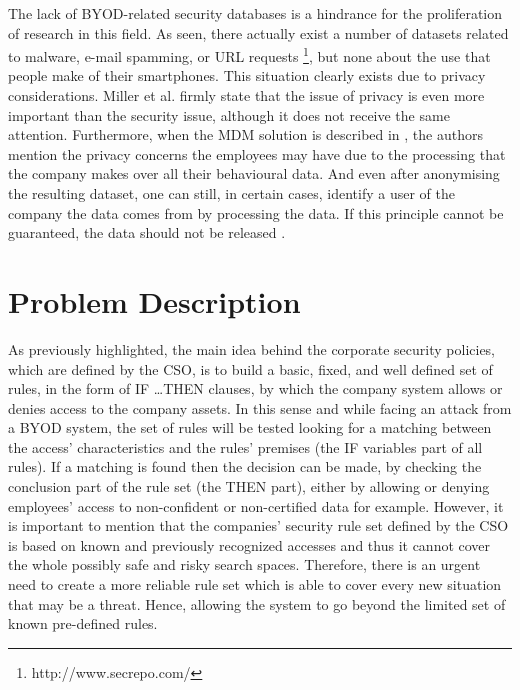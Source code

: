 \documentclass[a4paper,10pt,twocolumn,preprint,3p]{elsarticle}
\begin{document}
The lack of BYOD-related security databases is a hindrance for the proliferation of research in this field. As seen, there actually exist a number of datasets related to malware, e-mail spamming, or URL requests \footnote{http://www.secrepo.com/}, but none about the use that people make of their smartphones. This situation clearly exists due to privacy considerations. Miller et al. \cite{Miller201253} firmly state that the issue of privacy is even more important than the security issue, although it does not receive the same attention. Furthermore, when the MDM solution is described in \cite{ali2015analysis}, the authors mention the privacy concerns the employees may have due to the processing that the company makes over all their behavioural data. And even after anonymising the resulting dataset, one can still, in certain cases, identify a user of the company the data comes from by processing the data. If this principle cannot be guaranteed, the data should not be released \cite{boillat2014handbook}.


\section{Problem Description}
\label{sec:problem}

As previously highlighted, the main idea behind the corporate security policies, which are defined by the CSO, is to build a basic, fixed, and well defined set of rules, in the form of \textsc{IF \ldots THEN} clauses,  by which the company system allows or denies access to the company assets. In this sense and while facing an attack from a BYOD system, the set of rules will be tested looking for a matching between the access' characteristics and the rules' premises (the IF variables part of all rules). If a matching is found then the decision can be made, by checking the conclusion part of the rule set (the THEN part), either by allowing or denying employees' access to non-confident or non-certified data for example. However, it is important to mention that the companies' security rule set defined by the CSO is based on known and previously recognized accesses and thus it cannot cover the whole possibly safe and risky search spaces. Therefore, there is an urgent need to create a more reliable rule set which is able to cover every new situation that may be a threat. Hence, allowing the system to go beyond the limited set of known pre-defined rules.
\end{document}
